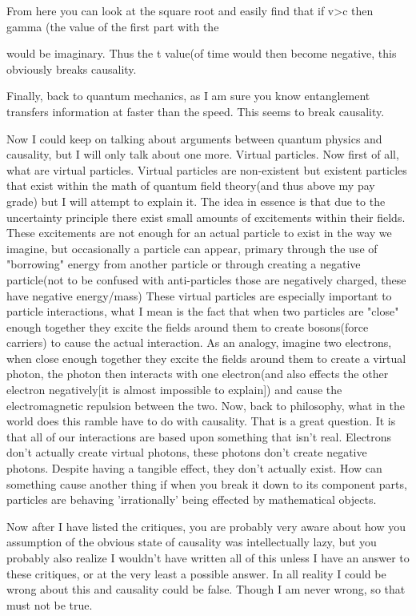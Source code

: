  
 
From here you can look at the square root and easily find that if v>c then gamma (the value of the first part with the

 
 
 
 
would be imaginary. Thus the t value(of time would then become negative, this obviously breaks causality.

Finally, back to quantum mechanics, as I am sure you know entanglement transfers information at faster than the speed. This seems to break causality.

Now I could keep on talking about arguments between quantum physics and causality, but I will only talk about one more. Virtual particles. Now first of all, what are virtual particles. Virtual particles are non-existent but existent particles that exist within the math of quantum field theory(and thus above my pay grade) but I will attempt to explain it. The idea in essence is that due to the uncertainty principle there exist small amounts of excitements within their fields. These excitements are not enough for an actual particle to exist in the way we imagine, but occasionally a particle can appear, primary through the use of "borrowing" energy from another particle or through creating a negative particle(not to be confused with anti-particles those are negatively charged, these have negative energy/mass) These virtual particles are especially important to particle interactions, what I mean is the fact that when two particles are "close" enough together they excite the fields around them to create bosons(force carriers) to cause the actual interaction. As an analogy, imagine two electrons, when close enough together they excite the fields around them to create a virtual photon, the photon then interacts with one electron(and also effects the other electron negatively[it is almost impossible to explain]) and cause the electromagnetic repulsion between the two. Now, back to philosophy, what in the world does this ramble have to do with causality. That is a great question. It is that all of our interactions are based upon something that isn't real. Electrons don't actually create virtual photons, these photons don't create negative photons. Despite having a tangible effect, they don't actually exist. How can something cause another thing if when you break it down to its component parts, particles are behaving 'irrationally' being effected by mathematical objects.

Now after I have listed the critiques, you are probably very aware about how you assumption of the obvious state of causality was intellectually lazy, but you probably also realize I wouldn't have written all of this unless I have an answer to these critiques, or at the very least a possible answer. In all reality I could be wrong about this and causality could be false. Though I am never wrong, so that must not be true.

